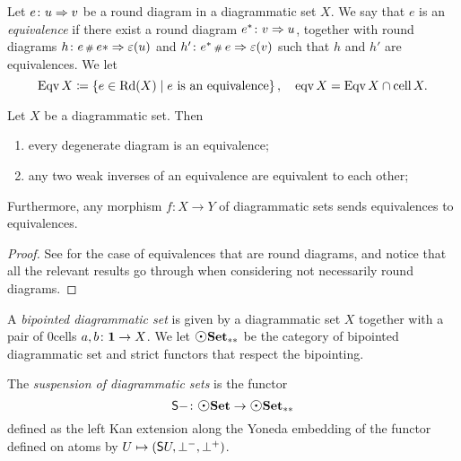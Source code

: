 \begin{dfn} [Equivalence] 
    Let \( e \colon u \Rightarrow v \) be a round diagram in a diagrammatic set \( X \).
    We say that \( e \) is an \emph{equivalence} if there exist a round diagram \( e^* \colon v \Rightarrow u \), together with round diagrams \( h \colon e \,{\scriptstyle\#}_{}\, e* \Rightarrow \varepsilon(u) \) and \( h' \colon e^* \,{\scriptstyle\#}_{}\, e \Rightarrow \varepsilon(v) \) such that \( h \) and \( h' \) are equivalences.
    We let
    \begin{equation*}
        \operatorname{Eqv} X \coloneqq \left\{ {e \in \operatorname{Rd}(X) \mid e \text{ is an equivalence}} \right\},\quad \operatorname{eqv} X = \operatorname{Eqv} X \cap \operatorname{cell} X.
    \end{equation*}
\end{dfn}

\begin{prop} \label{prop:main_equivalence}
    Let \( X \) be a diagrammatic set.
    Then
    \begin{enumerate}
        \item every degenerate diagram is an equivalence;
        \item any two weak inverses of an equivalence are equivalent to each other;
    \end{enumerate}
    Furthermore, any morphism \( f \colon X \to Y \) of diagrammatic sets sends equivalences to equivalences.
\end{prop}
\begin{proof}
    See \cite[Section]{chanavat2024equivalences} for the case of equivalences that are round diagrams, and notice that all the relevant results go through when considering not necessarily round diagrams.
\end{proof}

\begin{dfn} 
    A \emph{bipointed diagrammatic set} is given by a diagrammatic set \( X \) together with a pair of \( 0 \)\nbd cells \( a, b \colon \mathbf{1} \to X \).
    We let \( \bpt\dgmSet \) be the category of bipointed diagrammatic set and strict functors that respect the bipointing.
\end{dfn}

\begin{dfn} [Suspension]
    The \emph{suspension of diagrammatic sets} is the functor
    \begin{equation*}
        \sus{-} \colon \dgmSet \to \bpt{\dgmSet}
    \end{equation*} 
    defined as the left Kan extension along the Yoneda embedding of the functor defined on atoms by \( U \mapsto (\mathsf{S}{U}, \bot^-, \bot^+) \).
\end{dfn}

